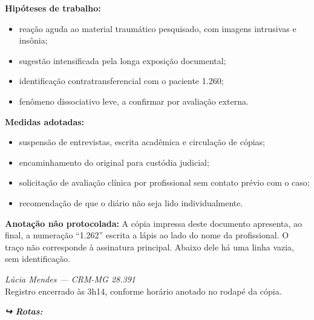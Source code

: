 {\noindent \textbf{Hipóteses de trabalho:}

\begin{itemize}
\item reação aguda ao material traumático pesquisado, com imagens intrusivas e insônia;
\item sugestão intensificada pela longa exposição documental;
\item identificação contratransferencial com o paciente 1.260;
\item fenômeno dissociativo leve, a confirmar por avaliação externa.
\end{itemize}

\noindent \textbf{Medidas adotadas:}

\begin{itemize}
\item suspensão de entrevistas, escrita acadêmica e circulação de cópias;
\item encaminhamento do original para custódia judicial;
\item solicitação de avaliação clínica por profissional sem contato prévio com o caso;
\item recomendação de que o diário não seja lido individualmente.
\end{itemize}

\noindent \textbf{Anotação não protocolada:}
\noindent A cópia impressa deste documento apresenta, ao final, a numeração ``1.262'' escrita a lápis ao lado do nome da profissional. O traço não corresponde à assinatura principal. Abaixo dele há uma linha vazia, sem identificação.

\noindent \textit{Lúcia Mendes --- CRM-MG 28.391}\\
\noindent Registro encerrado às 3h14, conforme horário anotado no rodapé da cópia.

\vspace{0.5em}
\noindent\textit{\textbf{↪ Rotas:}  \rotasep {} \rotasep {}}

}